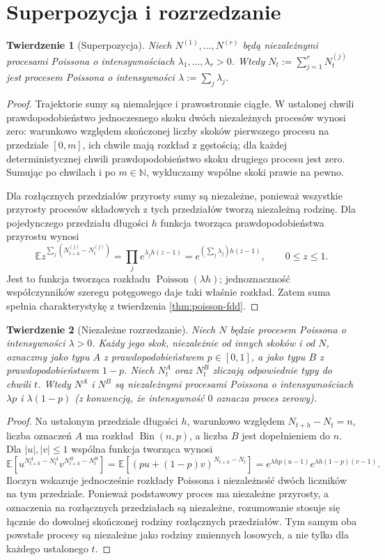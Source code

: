 \documentclass[11pt,a4paper,oneside]{report}
\numberwithin{equation}{chapter}
\theoremstyle{plain}
\newtheorem{twierdzenie}{Twierdzenie}[chapter]
\theoremstyle{definition}
\theoremstyle{remark}
\newcommand{\N}{\mathbb{N}}
\newcommand{\E}{\mathbb{E}}
\begin{document}
\section{Superpozycja i rozrzedzanie}
\begin{twierdzenie}[Superpozycja]
Niech $N^{(1)},\ldots,N^{(r)}$ będą niezależnymi procesami
Poissona o intensywnościach $\lambda_1,\ldots,\lambda_r>0$.
Wtedy $N_t:=\sum_{j=1}^rN_t^{(j)}$ jest procesem Poissona
o intensywności $\lambda:=\sum_j\lambda_j$.
\end{twierdzenie}
\begin{proof}
Trajektorie sumy są niemalejące i prawostronnie ciągłe.
W ustalonej chwili prawdopodobieństwo jednoczesnego skoku
dwóch niezależnych procesów wynosi zero: warunkowo względem
skończonej liczby skoków pierwszego procesu na przedziale
$[0,m]$, ich chwile mają rozkład z gęstością;
dla każdej deterministycznej chwili prawdopodobieństwo skoku
drugiego procesu jest zero. Sumując po chwilach i po $m\in\N$,
wykluczamy wspólne skoki prawie na pewno.

Dla rozłącznych przedziałów przyrosty sumy są niezależne,
ponieważ wszystkie przyrosty procesów składowych z tych
przedziałów tworzą niezależną rodzinę. Dla pojedynczego
przedziału długości $h$ funkcja tworząca prawdopodobieństwa
przyrostu wynosi
\[
\E z^{\sum_j (N_{t+h}^{(j)}-N_t^{(j)})}
=\prod_j e^{\lambda_j h(z-1)}
=e^{(\sum_j\lambda_j)h(z-1)},\qquad 0\le z\le1.
\]
Jest to funkcja tworząca rozkładu
$\operatorname{Poisson}(\lambda h)$; jednoznaczność
współczynników szeregu potęgowego daje taki właśnie rozkład.
Zatem suma spełnia charakterystykę z twierdzenia
\ref{thm:poisson-fdd}.
\end{proof}

\begin{twierdzenie}[Niezależne rozrzedzanie]
Niech $N$ będzie procesem Poissona o intensywności $\lambda>0$.
Każdy jego skok, niezależnie od innych skoków i od $N$,
oznaczmy jako typu $A$ z prawdopodobieństwem $p\in[0,1]$,
a jako typu $B$ z prawdopodobieństwem $1-p$.
Niech $N_t^A$ oraz $N_t^B$ zliczają odpowiednie typy do chwili $t$.
Wtedy $N^A$ i $N^B$ są \emph{niezależnymi} procesami Poissona
o intensywnościach $\lambda p$ i $\lambda(1-p)$
(z konwencją, że intensywność $0$ oznacza proces zerowy).
\end{twierdzenie}
\begin{proof}
Na ustalonym przedziale długości $h$, warunkowo względem
$N_{t+h}-N_t=n$, liczba oznaczeń $A$ ma rozkład
$\operatorname{Bin}(n,p)$, a liczba $B$ jest dopełnieniem do $n$.
Dla $|u|,|v|\le1$ wspólna funkcja tworząca wynosi
\[
\E\left[u^{N^A_{t+h}-N^A_t}v^{N^B_{t+h}-N^B_t}\right]
=\E[ (pu+(1-p)v)^{N_{t+h}-N_t}]
=e^{\lambda h p(u-1)}e^{\lambda h(1-p)(v-1)}.
\]
Iloczyn wskazuje jednocześnie rozkłady Poissona i
niezależność dwóch liczników na tym przedziale.
Ponieważ podstawowy proces ma niezależne przyrosty, a
oznaczenia na rozłącznych przedziałach są niezależne,
rozumowanie stosuje się łącznie do dowolnej skończonej
rodziny rozłącznych przedziałów. Tym samym oba powstałe
procesy są niezależne jako rodziny zmiennych losowych,
a nie tylko dla każdego ustalonego $t$.
\end{proof}
\end{document}

